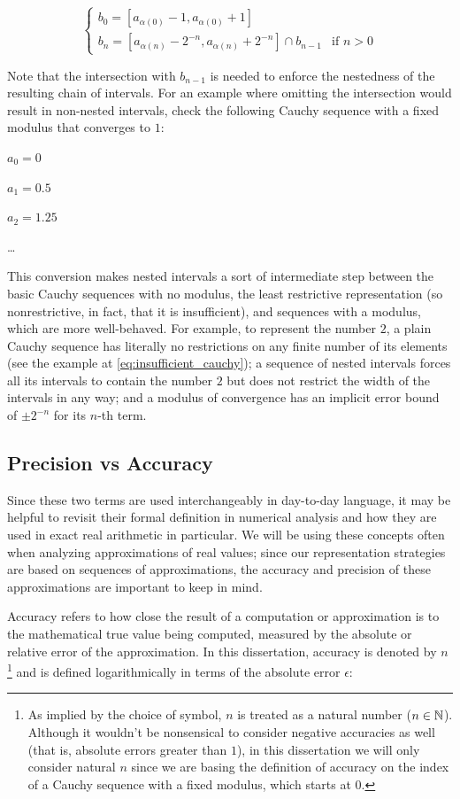 \begin{equation*}
  \begin{cases}
    b_0 = [a_{\alpha(0)}-1, a_{\alpha(0)}+1] & \\
    b_n = [a_{\alpha(n)}-2^{-n}, a_{\alpha(n)}+2^{-n}] \cap b_{n-1} & \text{if } n>0
  \end{cases}
\end{equation*}

Note that the intersection with $b_{n-1}$ is needed to enforce the nestedness of the resulting chain of intervals. For an example where omitting the intersection would result in non-nested intervals, check the following Cauchy sequence with a fixed modulus that converges to $1$:

$a_0 = 0$

$a_1 = 0.5$

$a_2 = 1.25$

\dots

This conversion makes nested intervals a sort of intermediate step between the basic Cauchy sequences with no modulus, the least restrictive representation (so nonrestrictive, in fact, that it is insufficient), and sequences with a modulus, which are more well-behaved. For example, to represent the number $2$, a plain Cauchy sequence has literally no restrictions on any finite number of its elements (see the example at \cref{eq:insufficient_cauchy}); a sequence of nested intervals forces all its intervals to contain the number $2$ but does not restrict the width of the intervals in any way; and a modulus of convergence has an implicit error bound of $\pm2^{-n}$ for its $n$-th term.



\subsection{Precision vs Accuracy}
\label{sec:precision_accuracy}

Since these two terms are used interchangeably in day-to-day language, it may be helpful to revisit their formal definition in numerical analysis and how they are used in exact real arithmetic in particular. We will be using these concepts often when analyzing approximations of real values; since our representation strategies are based on sequences of approximations, the accuracy and precision of these approximations are important to keep in mind.

Accuracy refers to how close the result of a computation or approximation is to the mathematical true value being computed, measured by the absolute or relative error of the approximation. In this dissertation, accuracy is denoted by $n$ \footnote{As implied by the choice of symbol, $n$ is treated as a natural number ($n \in \mathbb{N}$). Although it wouldn't be nonsensical to consider negative accuracies as well (that is, absolute errors greater than $1$), in this dissertation we will only consider natural $n$ since we are basing the definition of accuracy on the index of a Cauchy sequence with a fixed modulus, which starts at $0$.} and is defined logarithmically in terms of the absolute error $\epsilon$:

